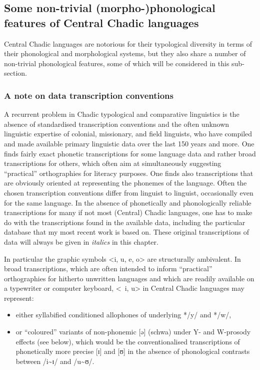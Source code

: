 \documentclass[output=paper]{langscibook}
\begin{document}
\subsection{Some non-trivial (morpho-)phonological features of Central Chadic languages}
\label{sec:Wolff:1.4}

Central Chadic languages are notorious for their typological diversity in terms of their phonological and morphological systems, but they also share a number of non-trivial phonological features, some of which will be considered in this sub-section. 

\subsubsection{A note on data transcription conventions}
\label{sec:Wolff:1.4.1}
A recurrent problem in Chadic typological and comparative linguistics is the absence of standardised transcription conventions and the often unknown linguistic expertise of colonial, missionary, and field linguists, who have compiled and made available primary linguistic data over the last 150 years and more. One finds fairly exact phonetic transcriptions for some language data and rather broad transcriptions for others, which often aim at simultaneously suggesting ``practical'' orthographies for literacy purposes. One finds also transcriptions that are obviously oriented at representing the phonemes of the language. Often the chosen transcription conventions differ from linguist to linguist, occasionally even for the same language. In the absence of phonetically and phonologically reliable transcriptions for many if not most (Central) Chadic languages, one has to make do with the transcriptions found in the available data, including the particular database \citep{Gravina2015} that my most recent work is based on. These original transcriptions of data will always be given in \textit{italics} in this chapter.

In particular the graphic symbols <i, u, e, o> are structurally ambivalent. In broad transcriptions, which are often intended to inform ``practical'' orthographies for hitherto unwritten languages and which are readily available on a typewriter or computer keyboard, <~i, u> in Central Chadic languages may represent:

\begin{itemize}
\item either syllabified conditioned allophones of underlying */y/ and */w/, 
\item or ``coloured'' variants of non-phonemic [ə] (schwa) under Y- and W-pros\-o\-dy effects (see below), which would be the conventionalised transcriptions of phonetically more precise [ɪ] and [ʊ] in the absence of phonological contrasts between /i{\textasciitilde}ɪ/ and /u{\textasciitilde}ʊ/.
\end{itemize}
\end{document}
